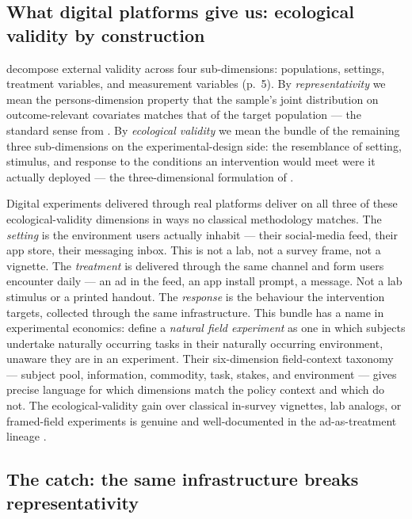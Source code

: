 \subsection{What digital platforms give us: ecological validity by construction}

\citet{CampbellStanley1963} decompose external validity across four sub-dimensions: populations, settings, treatment variables, and measurement variables (p.~5). By \emph{representativity} we mean the persons-dimension property that the sample's joint distribution on outcome-relevant covariates matches that of the target population --- the standard sense from \citet{Neyman1934}. By \emph{ecological validity} we mean the bundle of the remaining three sub-dimensions on the experimental-design side: the resemblance of setting, stimulus, and response to the conditions an intervention would meet were it actually deployed --- the three-dimensional formulation of \citet{Schmuckler2001}.

Digital experiments delivered through real platforms deliver on all three of these ecological-validity dimensions in ways no classical methodology matches. The \emph{setting} is the environment users actually inhabit --- their social-media feed, their app store, their messaging inbox. This is not a lab, not a survey frame, not a vignette. The \emph{treatment} is delivered through the same channel and form users encounter daily --- an ad in the feed, an app install prompt, a message. Not a lab stimulus or a printed handout. The \emph{response} is the behaviour the intervention targets, collected through the same infrastructure. This bundle has a name in experimental economics: \citet{Harrison2004} define a \emph{natural field experiment} as one in which subjects undertake naturally occurring tasks in their naturally occurring environment, unaware they are in an experiment. Their six-dimension field-context taxonomy --- subject pool, information, commodity, task, stakes, and environment --- gives precise language for which dimensions match the policy context and which do not. The ecological-validity gain over classical in-survey vignettes, lab analogs, or framed-field experiments is genuine and well-documented in the ad-as-treatment lineage \citep{Athey2023,Breza2021,Ho2023}.

\subsection{The catch: the same infrastructure breaks representativity}

